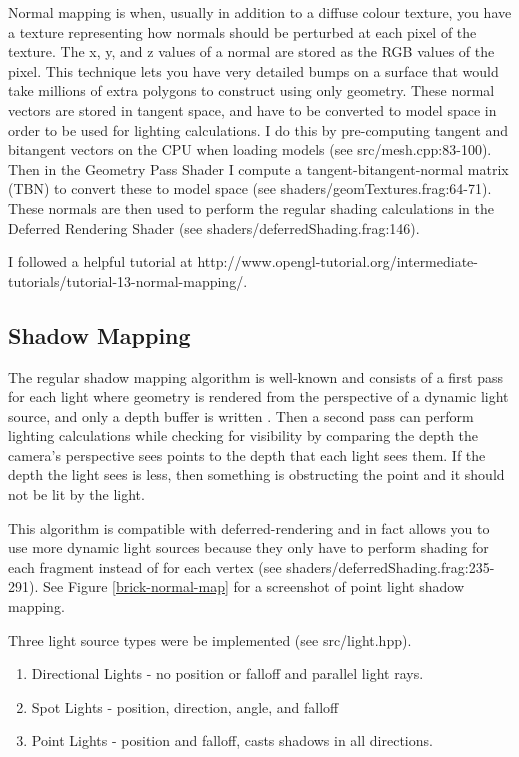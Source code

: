 \documentclass{book}
\begin{document}
      Normal mapping is when, usually in addition to a diffuse colour texture, you have a texture representing how normals should be perturbed at each pixel of the texture. The x, y, and z values of a normal are stored as the RGB values of the pixel. This technique lets you have very detailed bumps on a surface that would take millions of extra polygons to construct using only geometry. These normal vectors are stored in tangent space, and have to be converted to model space in order to be used for lighting calculations. I do this by pre-computing tangent and bitangent vectors on the CPU when loading models (see src/mesh.cpp:83-100). Then in the Geometry Pass Shader I compute a tangent-bitangent-normal matrix (TBN) to convert these to model space (see shaders/geomTextures.frag:64-71). These normals are then used to perform the regular shading calculations in the Deferred Rendering Shader (see shaders/deferredShading.frag:146).

      I followed a helpful tutorial at http://www.opengl-tutorial.org/intermediate-tutorials/tutorial-13-normal-mapping/.

    \subsection{Shadow Mapping} \label{shadow-mapping}
      The regular shadow mapping algorithm is well-known and consists of a first pass for each light where geometry is rendered from the perspective of a dynamic light source, and only a depth buffer is written \cite{williams1978casting}. Then a second pass can perform lighting calculations while checking for visibility by comparing the depth the camera's perspective sees points to the depth that each light sees them. If the depth the light sees is less, then something is obstructing the point and it should not be lit by the light.

      This algorithm is compatible with deferred-rendering and in fact allows you to use more dynamic light sources because they only have to perform shading for each fragment instead of for each vertex (see shaders/deferredShading.frag:235-291). See Figure \ref{brick-normal-map} for a screenshot of point light shadow mapping.

      Three light source types were be implemented (see src/light.hpp).
      \begin{enumerate}
        \item Directional Lights - no position or falloff and parallel light rays.
        \item Spot Lights - position, direction, angle, and falloff
        \item Point Lights - position and falloff, casts shadows in all directions.
      \end{enumerate}
\end{document}
